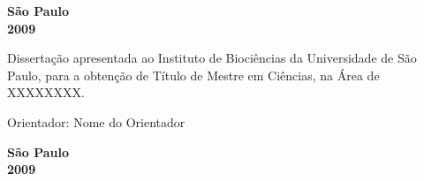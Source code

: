 \begin{titlepage}

\begin{center}
{\LARGE \nomedoaluno}
\par
\vspace{200pt}
{\Huge \titulo}
\par
\vfill
\textbf{{\large São Paulo}\\
{\large 2009}}
\end{center}
\end{titlepage}

\pagestyle{empty}
\cleardoublepage


\begin{center}
{\LARGE \nomedoaluno}
\par
\vspace{200pt}
{\Huge \titulo}
\end{center}
\par
\vspace{90pt}
\hspace*{175pt}\parbox{7.6cm}{{\large Dissertação apresentada ao Instituto de Biociências da Universidade de São Paulo, para a obtenção de Título de Mestre em Ciências, na Área de XXXXXXXX.}}

\par
\vspace{1em}
\hspace*{175pt}\parbox{7.6cm}{{\large Orientador: Nome do Orientador}}

\par
\vfill
\begin{center}
\textbf{{\large São Paulo}\\
{\large 2009}}
\end{center}

\newpage

